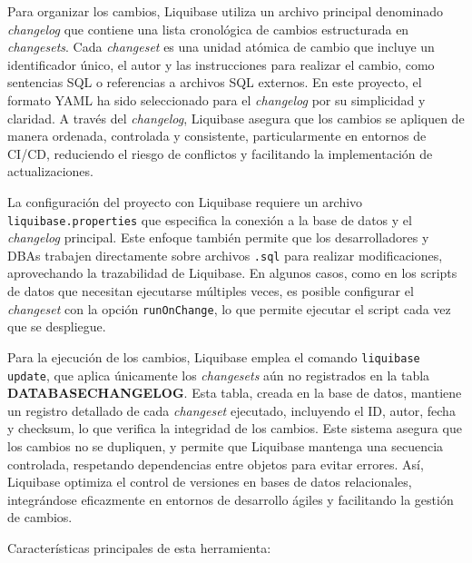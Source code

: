 \documentclass{IEEEtran}
\begin{document}
Para organizar los cambios, Liquibase utiliza un archivo principal denominado \textit{changelog} que contiene una lista cronológica de cambios estructurada en \textit{changesets}. Cada \textit{changeset} es una unidad atómica de cambio que incluye un identificador único, el autor y las instrucciones para realizar el cambio, como sentencias SQL o referencias a archivos SQL externos. En este proyecto, el formato YAML ha sido seleccionado para el \textit{changelog} por su simplicidad y claridad. A través del \textit{changelog}, Liquibase asegura que los cambios se apliquen de manera ordenada, controlada y consistente, particularmente en entornos de CI/CD, reduciendo el riesgo de conflictos y facilitando la implementación de actualizaciones.

La configuración del proyecto con Liquibase requiere un archivo \texttt{liquibase.properties} que especifica la conexión a la base de datos y el \textit{changelog} principal. Este enfoque también permite que los desarrolladores y DBAs trabajen directamente sobre archivos \texttt{.sql} para realizar modificaciones, aprovechando la trazabilidad de Liquibase. En algunos casos, como en los scripts de datos que necesitan ejecutarse múltiples veces, es posible configurar el \textit{changeset} con la opción \texttt{runOnChange}, lo que permite ejecutar el script cada vez que se despliegue.

Para la ejecución de los cambios, Liquibase emplea el comando \texttt{liquibase update}, que aplica únicamente los \textit{changesets} aún no registrados en la tabla \textbf{DATABASECHANGELOG}. Esta tabla, creada en la base de datos, mantiene un registro detallado de cada \textit{changeset} ejecutado, incluyendo el ID, autor, fecha y checksum, lo que verifica la integridad de los cambios. Este sistema asegura que los cambios no se dupliquen, y permite que Liquibase mantenga una secuencia controlada, respetando dependencias entre objetos para evitar errores. Así, Liquibase optimiza el control de versiones en bases de datos relacionales, integrándose eficazmente en entornos de desarrollo ágiles y facilitando la gestión de cambios.


Características principales de esta herramienta:
\end{document}
